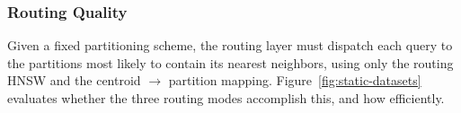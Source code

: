 \documentclass[sigconf,review,anonymous]{acmart}
\newcommand{\dk}[1]{\textcolor{teal}{(DK: #1)}}
\begin{document}





 \subsubsection{Routing Quality}
 \label{sec:routing-quality}
 Given a fixed partitioning scheme, the routing layer must dispatch each query to the partitions most likely to contain its nearest neighbors, using only the routing HNSW and the centroid $\rightarrow$ partition mapping. Figure~\ref{fig:static-datasets} evaluates whether the three routing modes accomplish this, and how efficiently.
\end{document}
